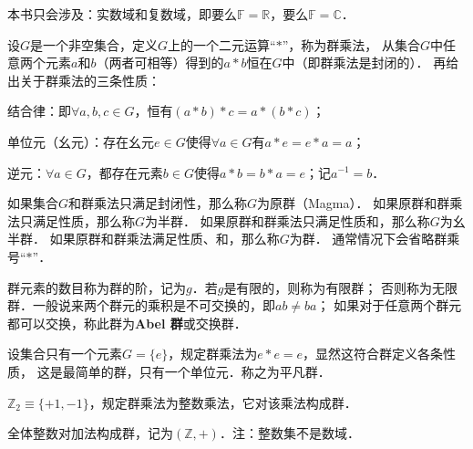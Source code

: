 本书只会涉及：实数域和复数域，即要么$\mathbb{F}=\mathbb{R}$，要么$\mathbb{F}=\mathbb{C}$．



\begin{definition}\label{chtop:def_group}
    设$G$是一个非空集合，定义$G$上的一个二元运算“$*$”，称为{\heiti 群乘法}，
    从集合$G$中任意两个元素$a$和$b$（两者可相等）得到的$a*b$恒在$G$中（即群乘法是{\heiti 封闭的}）．
    再给出关于群乘法的三条性质：
    
     结合律：即$\forall a,b,c \in G$，恒有$(a*b)*c=a*(b*c)$；
    
     单位元（幺元）：存在幺元$e\in G$使得$\forall a \in G$有$a*e=e*a=a$；
    
     逆元：$\forall a \in G$，都存在元素$b\in G$使得$a*b=b*a=e$；记$a^{-1}=b$．
    
    如果集合$G$和群乘法只满足封闭性，那么称$G$为{\heiti 原群}（Magma）．
    如果原群和群乘法只满足性质，那么称$G$为{\heiti 半群}．
    如果原群和群乘法只满足性质和，那么称$G$为{\heiti 幺半群}．
    如果原群和群乘法满足性质、和，那么称$G$为{\heiti 群}．
    通常情况下会省略群乘号“$*$”．  %
\end{definition}
群元素的数目称为群的{\heiti 阶}，记为$g$．若$g$是有限的，则称为{\heiti 有限群}；
否则称为{\heiti 无限群}．一般说来两个群元的乘积是不可交换的，即$ab\neq ba$；
如果对于任意两个群元都可以交换，称此群为{\heiti \bfseries Abel 群}或{\heiti 交换群}．

\begin{example}
    设集合只有一个元素$G=\{e\}$，规定群乘法为$e*e=e$，显然这符合群定义各条性质，
    这是最简单的群，只有一个单位元．称之为{\heiti 平凡群}．
\end{example}

\begin{example}
	$\mathbb{Z}_{2}\equiv \{+1,-1\}$，规定群乘法为整数乘法，它对该乘法构成群．  
\end{example}

\begin{example}
	全体整数对加法构成群，记为$(\mathbb{Z},+)$．注：整数集不是数域． 
\end{example}



